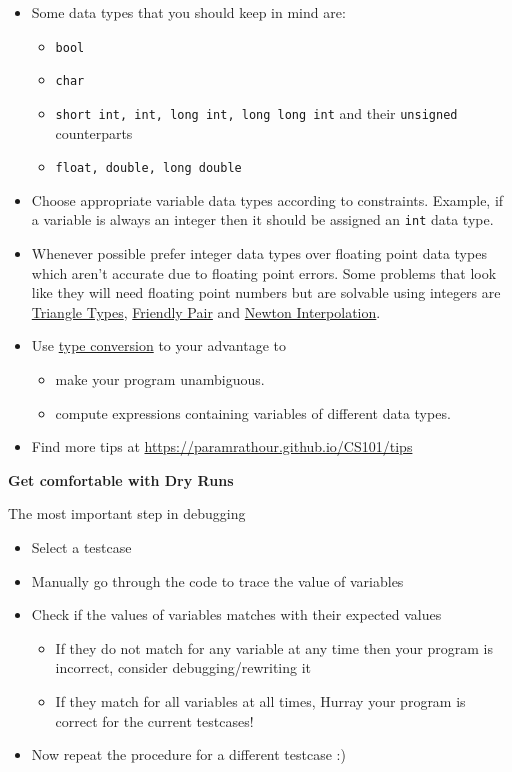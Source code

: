 \begin{itemize}
\item Some data types that you should keep in mind are:
	\begin{itemize}
	\item \verb!bool!
	\item \verb!char!
	\item \verb!short int, int, long int, long long int! and their \verb!unsigned! counterparts
	\item \verb!float, double, long double!
	\end{itemize}
\item Choose appropriate variable data types according to constraints. Example, if a variable is always an integer then it should be assigned an \verb!int! data type.
\item Whenever possible prefer integer data types over floating point data types which aren't accurate due to floating point errors. Some problems that look like they will need floating point numbers but are solvable using integers are \hyperref[pp:triangletypes]{Triangle Types}, \hyperref[pp:friendlypair]{Friendly Pair} and \hyperref[pp:newtoninterpolation]{Newton Interpolation}.
\item Use \href{https://www.geeksforgeeks.org/type-conversion-in-c/}{type conversion} to your advantage to
	\begin{itemize}
	\item make your program unambiguous.
	\item compute expressions containing variables of different data types.
	\end{itemize}
\item Find more tips at \url{https://paramrathour.github.io/CS101/tips}
\end{itemize}
\begin{center}
	\textbf{\large{Get comfortable with Dry Runs}}
\end{center}
The most important step in debugging
\begin{itemize}	
\item Select a testcase
\item Manually go through the code to trace the value of variables
\item Check if the values of variables matches with their expected values
\begin{itemize}
	\item If they do not match for any variable at any time then your program is incorrect, consider debugging/rewriting it
	\item If they match for all variables at all times, Hurray your program is correct for the current testcases!
\end{itemize}
\item Now repeat the procedure for a different testcase :)
\end{itemize}